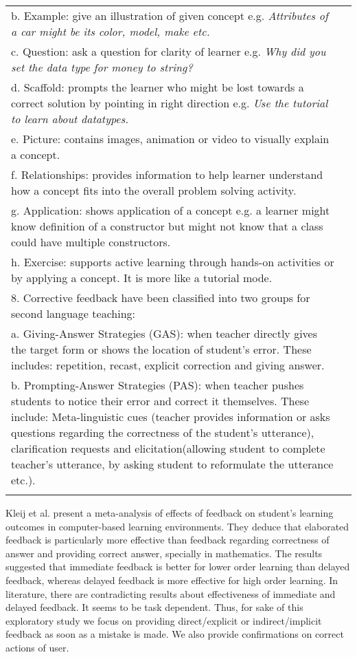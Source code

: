 \begin{longtable}{ | m{30em} | m{2cm}|  }
b. Example: give an illustration of given concept e.g. \emph{Attributes of a car might be its color, model, make etc.} & \\
c. Question: ask a question for clarity of learner e.g. \emph{Why did you set the data type for money to string?} & \\
d. Scaffold: prompts the learner who might be lost towards a correct solution by pointing in right direction e.g. \emph{Use the tutorial to learn about datatypes.} & \\
e. Picture: contains images, animation or video to visually explain a concept. & \\
f. Relationships: provides information to help learner understand how a concept fits into the overall problem solving activity. & \\
g. Application: shows application of a concept e.g. a learner might know definition of a constructor but might not know that a class could have multiple constructors. & \\
h. Exercise: supports active learning through hands-on activities or by applying a concept. It is more like a tutorial mode. & \\
\hline
8. Corrective feedback have been classified into two groups for second language teaching: & \parencite{ferreira2007study} \\
a. Giving-Answer Strategies (GAS): when teacher directly gives the target form or shows the location of student's error. These includes: repetition, recast, explicit correction and giving answer. &\\
b. Prompting-Answer Strategies (PAS): when teacher pushes students to notice their error and correct it themselves. These include: Meta-linguistic cues (teacher provides information or asks questions regarding the correctness of the student's utterance), clarification requests and elicitation(allowing student to complete teacher's utterance, by asking student to reformulate the utterance etc.). & \\
\hline
\caption[Feedback strategies from literature]{}
\label{tab:tab_2-1}

\end{longtable}

Kleij et al. \parencite{van2015effects} present a meta-analysis of effects of feedback on  student's learning outcomes in computer-based learning environments. They deduce that elaborated feedback is particularly more effective than feedback regarding correctness of answer and providing correct answer, specially in mathematics. The results suggested that immediate feedback is better for lower order learning than delayed feedback, whereas delayed feedback is more effective for high order learning. In literature, there are contradicting results about effectiveness of immediate and delayed feedback. It seems to be task dependent. Thus, for sake of this exploratory study we focus on providing direct/explicit or indirect/implicit feedback as soon as a mistake is made. We also provide confirmations on correct actions of user.  




